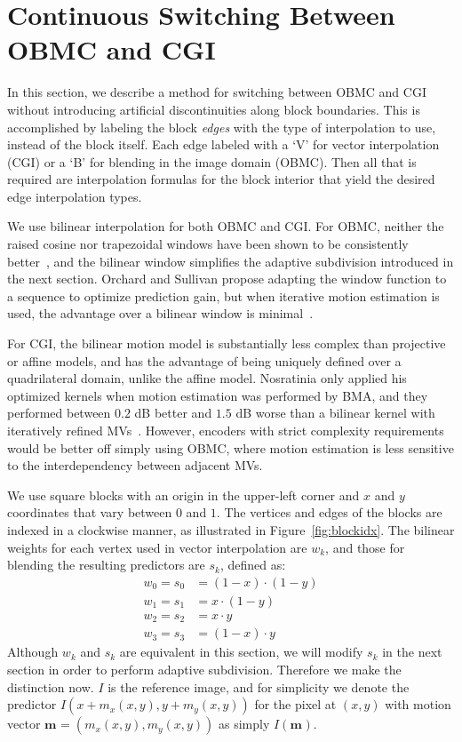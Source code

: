\documentclass[11pt,letterpaper]{article}
\newcommand{\w}[1]{\ensuremath{{w_{#1}}}}
\newcommand{\s}[1]{\ensuremath{{s_{#1}}}}
\newcommand{\m}[1]{\ensuremath{{\mathbf{m}_{#1}}}}
\begin{document}
\section{Continuous Switching Between OBMC and CGI}
\label{sec:switching}

In this section, we describe a method for switching between OBMC and CGI
 without introducing artificial discontinuities along block boundaries.
This is accomplished by labeling the block \textit{edges} with the type of
 interpolation to use, instead of the block itself.
Each edge labeled with a `V' for vector interpolation (CGI) or a `B' for
 blending in the image domain (OBMC).
Then all that is required are interpolation formulas for the block interior
 that yield the desired edge interpolation types.

We use bilinear interpolation for both OBMC and CGI.
For OBMC, neither the raised cosine nor trapezoidal windows have been shown to
 be consistently better~\cite{ZSNKI02}, and the bilinear window simplifies the
 adaptive subdivision introduced in the next section.
Orchard and Sullivan propose adapting the window function to a sequence to
 optimize prediction gain, but when iterative motion estimation is used, the
 advantage over a bilinear window is minimal~\cite{OS94}.

For CGI, the bilinear motion model is substantially less complex than
 projective or affine models, and has the advantage of being uniquely defined
 over a quadrilateral domain, unlike the affine model.
Nosratinia only applied his optimized kernels when motion estimation was
 performed by BMA, and they performed between $0.2$ dB better and $1.5$ dB
 worse than a bilinear kernel with iteratively refined MVs~\cite{Nos01}.
However, encoders with strict complexity requirements would be better off
 simply using OBMC, where motion estimation is less sensitive to the
 interdependency between adjacent MVs.

We use square blocks with an origin in the upper-left corner and $x$ and $y$
 coordinates that vary between $0$ and $1$.
The vertices and edges of the blocks are indexed in a clockwise manner, as
 illustrated in Figure~\ref{fig:blockidx}.
The bilinear weights for each vertex used in vector interpolation are $\w k$,
 and those for blending the resulting predictors are $\s k$, defined as:
\begin{align*}
\w0 = \s0 & = (1-x)\cdot (1-y) \\
\w1 = \s1 & = x\cdot (1-y) \\
\w2 = \s2 & = x\cdot y \\
\w3 = \s3 & = (1-x)\cdot y
\end{align*}
Although $\w k$ and $\s k$ are equivalent in this section, we will modify 
 $\s k$ in the next section in order to perform adaptive subdivision.
Therefore we make the distinction now.
$I$ is the reference image, and for simplicity we denote the predictor
 $I(x+m_x(x,y),y+m_y(x,y))$ for the pixel at $(x,y)$ with motion vector
 $\m{}=(m_x(x,y),m_y(x,y))$ as simply $I(\m{})$.
\end{document}
